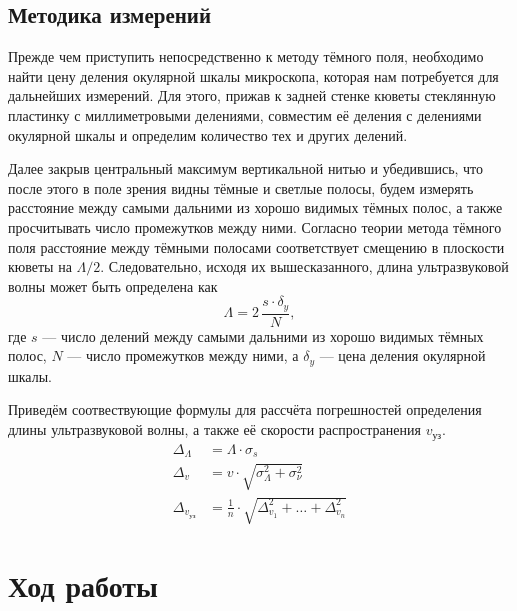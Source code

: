 \documentclass[12pt]{article}
\begin{document}
\subsection*{Методика измерений}
\par
	Прежде чем приступить непосредственно к методу тёмного поля, необходимо найти цену деления окулярной шкалы микроскопа, которая нам потребуется для дальнейших измерений. Для этого, прижав к задней стенке кюветы стеклянную пластинку с миллиметровыми делениями, совместим её деления с делениями окулярной шкалы и определим количество тех и других делений.
\par
	Далее закрыв центральный максимум вертикальной нитью и убедившись, что после этого в поле зрения видны тёмные и светлые полосы, будем измерять расстояние между самыми дальними из хорошо видимых тёмных полос, а также просчитывать число промежутков между ними. Согласно теории метода тёмного поля расстояние между тёмными полосами соответствует смещению в плоскости кюветы на $\Lambda / 2$. Следовательно, исходя их вышесказанного, длина ультразвуковой волны может быть определена как
\[
	\Lambda = 2 \, \frac{s \cdot \delta_y}{N},
\]
где $s$ --- число делений между самыми дальними из хорошо видимых тёмных полос, $N$ --- число промежутков между ними, а $\delta_y $ --- цена деления окулярной шкалы.
\par
	Приведём соотвествующие формулы для рассчёта погрешностей определения длины ультразвуковой волны, а также её скорости распространения $v_\text{уз}$.
\begin{align*}
	\Delta_\Lambda &= \Lambda \cdot \sigma_s \\
	\Delta_v &= v \cdot \sqrt{\sigma_\Lambda^2 + \sigma_\nu^2} \\
	\Delta_\text{$v_\text{уз}$} &= \frac{1}{n} \cdot \sqrt{\Delta_\text{$v_1$}^2 + \dots + \Delta_\text{$v_n$}^2}
\end{align*}
\section*{Ход работы}
\end{document}
